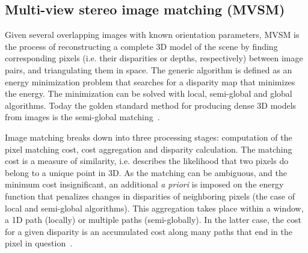 \documentclass[twocolumn]{bmcart}%
\begin{document}
\subsection*{Multi-view stereo image matching (MVSM)}%
%
Given several overlapping images with known orientation parameters, MVSM is the process of reconstructing a complete 3D model of the scene by finding corresponding pixels (i.e. their disparities or depths, respectively) between image pairs, and triangulating them in space. The generic algorithm is defined as an energy minimization problem that searches for a disparity map that minimizes the energy. The minimization can be solved with local, semi-global and global algorithms. Today the golden standard method for producing dense 3D models from images is the semi-global matching~\cite{hirschmuller2008stereo}.\par
%
Image matching breaks down into three processing stages: computation of the pixel matching cost, cost aggregation and disparity calculation. The matching cost is a measure of similarity, i.e. describes the likelihood that two pixels do belong to a unique point in 3D. %
As the matching can be ambiguous, and the minimum cost insignificant, an additional \textit{a priori} is imposed on the energy function that penalizes changes in disparities of neighboring pixels (the case of local and semi-global algorithms). This aggregation takes place within a window, a 1D path (locally) or multiple paths (semi-globally). In the latter case, the cost for a given disparity is an accumulated cost along many paths that end in the pixel in question~\cite{szeliski2010computer}.
%
\end{document}
